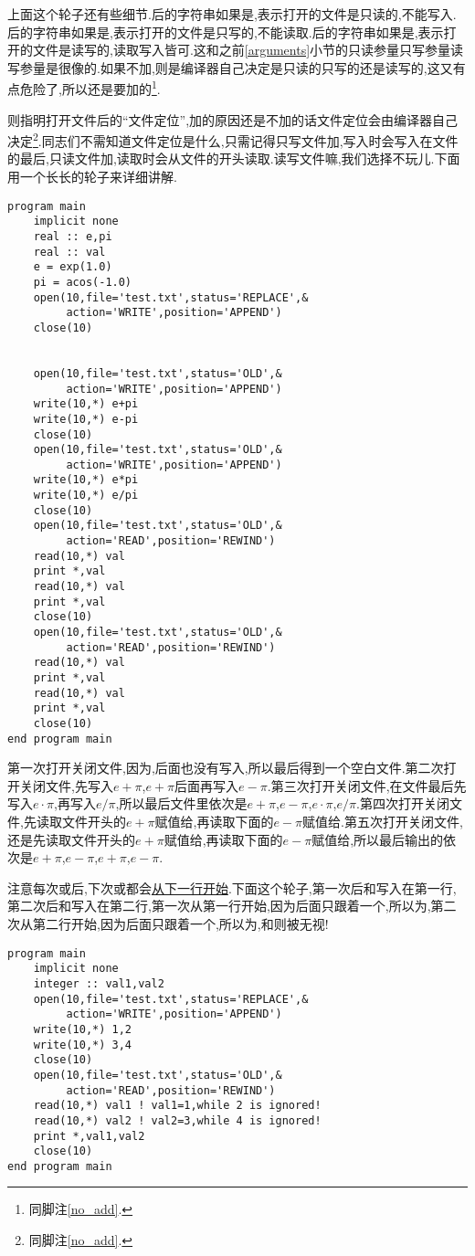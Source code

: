 上面这个轮子还有些细节.后的字符串如果是,表示打开的文件是只读的,不能写入.后的字符串如果是,表示打开的文件是只写的,不能读取.后的字符串如果是,表示打开的文件是读写的,读取写入皆可.这和之前\ref{arguments}小节的只读参量只写参量读写参量是很像的.如果不加,则是编译器自己决定是只读的只写的还是读写的,这又有点危险了,所以还是要加的\footnote{同脚注\ref{no_add}.}.

则指明打开文件后的``文件定位'',加的原因还是不加的话文件定位会由编译器自己决定\footnote{同脚注\ref{no_add}.}.同志们不需知道文件定位是什么,只需记得只写文件加,写入时会写入在文件的最后,只读文件加,读取时会从文件的开头读取.读写文件嘛,我们选择不玩儿.下面用一个长长的轮子来详细讲解.
\begin{lstlisting}
program main
    implicit none
    real :: e,pi
    real :: val
    e = exp(1.0)
    pi = acos(-1.0)
    open(10,file='test.txt',status='REPLACE',&
         action='WRITE',position='APPEND')
    close(10)


    open(10,file='test.txt',status='OLD',&
         action='WRITE',position='APPEND')
    write(10,*) e+pi
    write(10,*) e-pi
    close(10)
    open(10,file='test.txt',status='OLD',&
         action='WRITE',position='APPEND')
    write(10,*) e*pi
    write(10,*) e/pi
    close(10)
    open(10,file='test.txt',status='OLD',&
         action='READ',position='REWIND')
    read(10,*) val
    print *,val
    read(10,*) val
    print *,val
    close(10)
    open(10,file='test.txt',status='OLD',&
         action='READ',position='REWIND')
    read(10,*) val
    print *,val
    read(10,*) val
    print *,val
    close(10)
end program main
\end{lstlisting}
第一次打开关闭文件,因为,后面也没有写入,所以最后得到一个空白文件.第二次打开关闭文件,先写入$e+\pi$,$e+\pi$后面再写入$e-\pi$.第三次打开关闭文件,在文件最后先写入$e\cdot\pi$,再写入$e/\pi$,所以最后文件里依次是$e+\pi$,$e-\pi$,$e\cdot\pi$,$e/\pi$.第四次打开关闭文件,先读取文件开头的$e+\pi$赋值给,再读取下面的$e-\pi$赋值给.第五次打开关闭文件,还是先读取文件开头的$e+\pi$赋值给,再读取下面的$e-\pi$赋值给,所以最后输出的依次是$e+\pi$,$e-\pi$,$e+\pi$,$e-\pi$.

注意每次或后,下次或都会\uline{从下一行开始}.下面这个轮子,第一次后和写入在第一行,第二次后和写入在第二行,第一次从第一行开始,因为后面只跟着一个,所以为,第二次从第二行开始,因为后面只跟着一个,所以为,和则被无视!
\begin{lstlisting}
program main
    implicit none
    integer :: val1,val2
    open(10,file='test.txt',status='REPLACE',&
         action='WRITE',position='APPEND')
    write(10,*) 1,2
    write(10,*) 3,4
    close(10)
    open(10,file='test.txt',status='OLD',&
         action='READ',position='REWIND')
    read(10,*) val1 ! val1=1,while 2 is ignored!
    read(10,*) val2 ! val2=3,while 4 is ignored!
    print *,val1,val2
    close(10)
end program main
\end{lstlisting}

